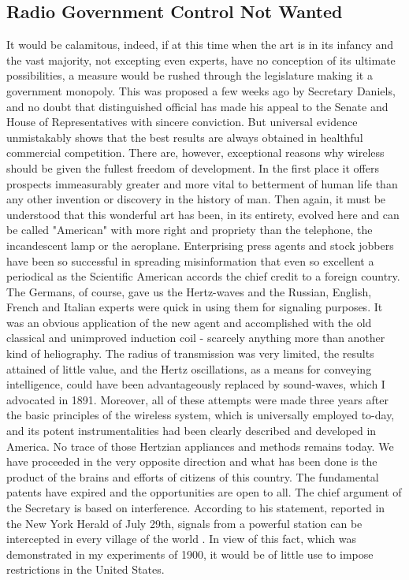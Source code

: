 \documentclass[a4paper,12pt,english,twoside,openright]{memoir}
\begin{document}
\subsection{Radio Government Control Not Wanted}
It would be calamitous, indeed, if at this time when the art is in its infancy and the vast majority, 
not excepting even experts, have no conception of its ultimate possibilities, a measure would be 
rushed through the legislature making it a government monopoly.  This was proposed a few 
weeks ago by Secretary Daniels, and no doubt that distinguished official has made his appeal to 
the Senate and House of Representatives with sincere conviction.  But universal evidence 
unmistakably shows that the best results are always obtained in healthful commercial 
competition.  There are, however, exceptional reasons why wireless should be given the fullest 
freedom of development.  In the first place it offers prospects immeasurably greater and more 
vital to betterment of human life than any other invention or discovery in the history of man.  Then 
again, it must be understood that this wonderful art has been, in its entirety, evolved here and can 
be called "American" with more right and propriety than the telephone, the incandescent lamp or 
the aeroplane.  Enterprising press agents and stock jobbers have been so successful in 
spreading misinformation that even so excellent a periodical as the Scientific American accords 
the chief credit to a foreign country.  The Germans, of course, gave us the Hertz-waves and the 
Russian, English, French and Italian experts were quick in using them for signaling purposes.  It 
was an obvious application of the new agent and accomplished with the old classical and 
unimproved induction coil - scarcely anything more than another kind of heliography.  The radius 
of transmission was very limited, the results attained of little value, and the Hertz oscillations, as a 
means for conveying intelligence, could have been advantageously replaced by sound-waves, 
which I advocated in 1891.  Moreover, all of these attempts were made three years after the basic 
principles of the wireless system, which is universally employed to-day, and its potent 
instrumentalities had been clearly described and developed in America.  No trace of those 
Hertzian appliances and methods remains today.  We have proceeded in the very opposite 
direction and what has been done is the product of the brains and efforts of citizens of this 
country.  The fundamental patents have expired and the opportunities are open to all.  The chief 
argument of the Secretary is based on interference.  According to his statement, reported in the 
New York Herald of July 29th, signals from a powerful station can be intercepted in every village 
of the world .  In view of this fact, which was demonstrated in my experiments of 1900, it would be 
of little use to impose restrictions in the United States.  
\end{document}
